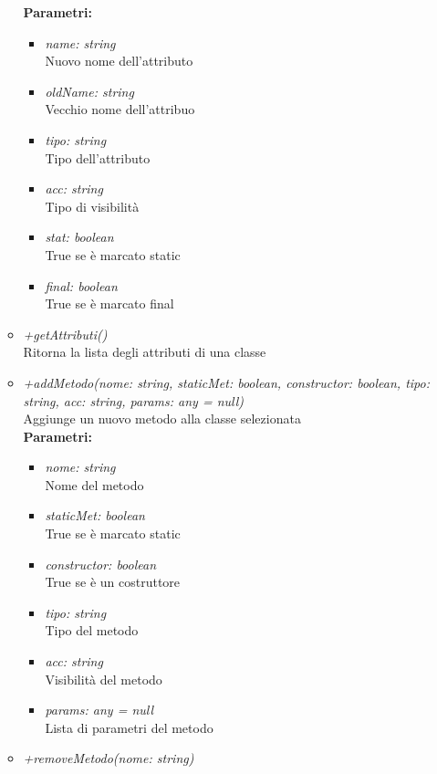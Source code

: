 \begin{itemize}
\begin{itemize}
    		\textbf{Parametri:}
    		\begin{itemize}
    			\item \emph{name: string}\\
    			Nuovo nome dell'attributo
    			\item \emph{oldName: string}\\
    			Vecchio nome dell'attribuo
    			\item \emph{tipo: string}\\
    			Tipo dell'attributo
    			\item \emph{acc: string}\\
    			Tipo di visibilità
    			\item \emph{stat: boolean}\\
    			True se è marcato static
    			\item \emph{final: boolean}\\
    			True se è marcato final
    		\end{itemize}
    		\item \emph{+getAttributi()}\\
    		Ritorna la lista degli attributi di una classe
    		\item \emph{+addMetodo(nome: string, staticMet: boolean, constructor: boolean, tipo: string, acc: string, params: any = null)}\\
    		Aggiunge un nuovo metodo alla classe selezionata\\
    		\textbf{Parametri:}
    		\begin{itemize}
    			\item \emph{nome: string}\\
    			Nome del metodo
    			\item \emph{staticMet: boolean}\\
    			True se è marcato static
    			\item \emph{constructor: boolean}\\
    			True se è un costruttore
    			\item \emph{tipo: string}\\
    			Tipo del metodo
    			\item \emph{acc: string}\\
    			Visibilità del metodo
    			\item \emph{params: any = null}\\
    			Lista di parametri del metodo
    		\end{itemize}
    		\item \emph{+removeMetodo(nome: string)}\\

\end{itemize}
\end{itemize}

